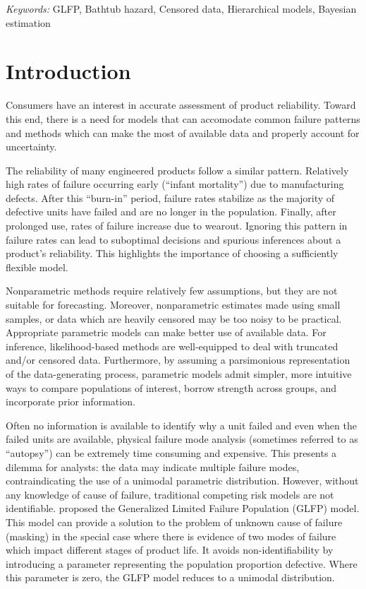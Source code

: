 \documentclass[12pt]{article}
\begin{document}
\noindent%
{\it Keywords:} GLFP, Bathtub hazard, Censored data, Hierarchical models, Bayesian estimation
\vfill

\newpage
\tableofcontents
\newpage
{} %
\section{Introduction}
Consumers have an interest in accurate assessment of product reliability. Toward this end, there is a need for models that can accomodate common failure patterns and methods which can make the most of available data and properly account for uncertainty.

The reliability of many engineered products follow a similar pattern. Relatively high rates of failure occurring early (``infant mortality'') due to manufacturing defects.  After this ``burn-in'' period, failure rates stabilize as the majority of defective units have failed and are no longer in the population.  Finally, after prolonged use, rates of failure increase due to wearout.  Ignoring this pattern in failure rates can lead to suboptimal decisions and spurious inferences about a product's reliability. This highlights the importance of choosing a sufficiently flexible model.

Nonparametric methods require relatively few assumptions, but they are not suitable for forecasting. Moreover, nonparametric estimates made using small samples, or data which are heavily censored may be too noisy to be practical. Appropriate parametric models can make better use of available data. For inference, likelihood-based methods are well-equipped to deal with truncated and/or censored data. Furthermore, by assuming a parsimonious representation of the data-generating process, parametric models admit simpler, more intuitive ways to compare populations of interest, borrow strength across groups, and incorporate prior information. 

Often no information is available to identify why a unit failed and even when the failed units are available, physical failure mode analysis (sometimes referred to as ``autopsy'') can be extremely time consuming and expensive. This presents a dilemma for analysts: the data may indicate multiple failure modes, contraindicating the use of a unimodal parametric distribution. However, without any knowledge of cause of failure, traditional competing risk models are not identifiable. \citet{chan} proposed the Generalized Limited Failure Population (GLFP) model. This model can provide a solution to the problem of unknown cause of failure (masking) in the special case where there is evidence of two modes of failure which impact different stages of product life. It avoids non-identifiability by introducing a parameter representing the population proportion defective. Where this parameter is zero, the GLFP model reduces to a unimodal distribution. \\
\end{document}
